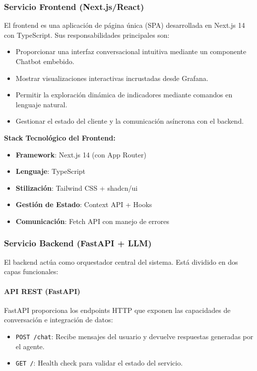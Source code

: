 \documentclass[11pt, a4paper]{report}
\begin{document}
\subsubsection{Servicio Frontend (Next.js/React)}

El frontend es una aplicación de página única (SPA) desarrollada en Next.js 14 con TypeScript. Sus responsabilidades principales son:

\begin{itemize}
    \item Proporcionar una interfaz conversacional intuitiva mediante un componente Chatbot embebido.
    \item Mostrar visualizaciones interactivas incrustadas desde Grafana.
    \item Permitir la exploración dinámica de indicadores mediante comandos en lenguaje natural.
    \item Gestionar el estado del cliente y la comunicación asíncrona con el backend.
\end{itemize}

\textbf{Stack Tecnológico del Frontend:}
\begin{itemize}
    \item \textbf{Framework}: Next.js 14 (con App Router)
    \item \textbf{Lenguaje}: TypeScript
    \item \textbf{Stilización}: Tailwind CSS + shadcn/ui
    \item \textbf{Gestión de Estado}: Context API + Hooks
    \item \textbf{Comunicación}: Fetch API con manejo de errores
\end{itemize}

\subsubsection{Servicio Backend (FastAPI + LLM)}

El backend actúa como orquestador central del sistema. Está dividido en dos capas funcionales:

\paragraph{API REST (FastAPI)}

FastAPI proporciona los endpoints HTTP que exponen las capacidades de conversación e integración de datos:

\begin{itemize}
    \item \texttt{POST /chat}: Recibe mensajes del usuario y devuelve respuestas generadas por el agente.
    \item \texttt{GET /}: Health check para validar el estado del servicio.
\end{itemize}
\end{document}
